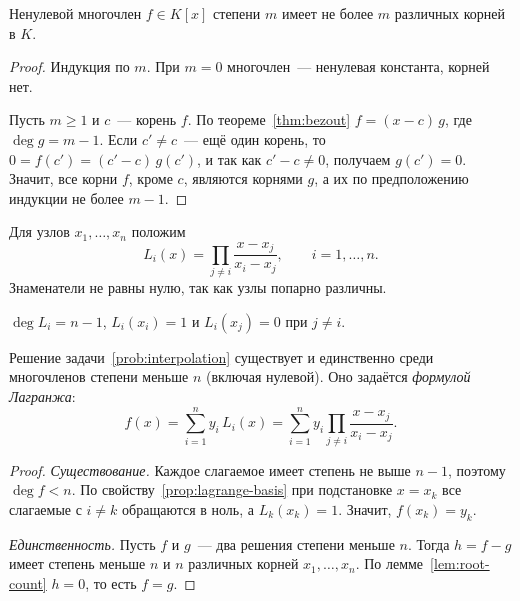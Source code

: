 \documentclass[12pt]{article}
\begin{document}
	\begin{lemma}\label{lem:root-count}
		Ненулевой многочлен $f \in K[x]$ степени $m$ имеет не более $m$ различных корней в $K$.
	\end{lemma}

	\begin{proof}
		Индукция по $m$. При $m = 0$ многочлен~--- ненулевая константа, корней нет.

		Пусть $m \geqslant 1$ и $c$~--- корень $f$. По теореме~\ref{thm:bezout} $f = (x - c)\,g$, где $\deg g = m - 1$. Если $c' \ne c$~--- ещё один корень, то $0 = f(c') = (c' - c)\,g(c')$, и так как $c' - c \ne 0$, получаем $g(c') = 0$. Значит, все корни $f$, кроме $c$, являются корнями $g$, а их по предположению индукции не более $m - 1$.
	\end{proof}

	\begin{definition}\label{def:lagrange-basis}
		Для узлов $x_1, \dots, x_n$ положим
		\[
			L_i(x) = \prod_{j \ne i} \frac{x - x_j}{x_i - x_j}, \qquad i = 1, \dots, n.
		\]
		Знаменатели не равны нулю, так как узлы попарно различны.
	\end{definition}

	\begin{property}\label{prop:lagrange-basis}
		$\deg L_i = n - 1$, $L_i(x_i) = 1$ и $L_i(x_j) = 0$ при $j \ne i$.
	\end{property}

	\begin{theorem}[об интерполяции]\label{thm:interpolation}
		Решение задачи~\ref{prob:interpolation} существует и единственно среди многочленов степени меньше $n$ (включая нулевой). Оно задаётся \emph{формулой Лагранжа}:
		\[
			f(x) = \sum_{i=1}^{n} y_i\,L_i(x) = \sum_{i=1}^{n} y_i \prod_{j \ne i} \frac{x - x_j}{x_i - x_j}.
		\]
	\end{theorem}

	\begin{proof}
		\emph{Существование.} Каждое слагаемое имеет степень не выше $n - 1$, поэтому $\deg f < n$. По свойству~\ref{prop:lagrange-basis} при подстановке $x = x_k$ все слагаемые с $i \ne k$ обращаются в ноль, а $L_k(x_k) = 1$. Значит, $f(x_k) = y_k$.

		\emph{Единственность.} Пусть $f$ и $g$~--- два решения степени меньше $n$. Тогда $h = f - g$ имеет степень меньше $n$ и $n$ различных корней $x_1, \dots, x_n$. По лемме~\ref{lem:root-count} $h = 0$, то есть $f = g$.
	\end{proof}
\end{document}

